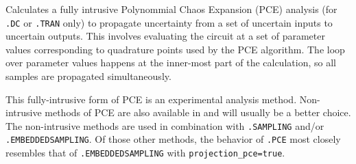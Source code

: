 

\label{PCE_section}
Calculates a fully intrusive Polynommial Chaos Expansion (PCE) analysis 
(for \verb|.DC| or \verb|.TRAN| only) 
to propagate uncertainty from a set of uncertain inputs to uncertain outputs.
This involves evaluating the circuit at a set of parameter values corresponding to
quadrature points used by the PCE algorithm.
The loop over parameter values happens at the inner-most part of the calculation, 
so all samples are propagated simultaneously.

This fully-intrusive form of PCE is an experimental analysis method.  Non-intrusive 
methods of PCE are also available in \Xyce{} and will usually be a better choice.  
The non-intrusive methods are used in combination with \texttt{.SAMPLING} 
and/or \texttt{.EMBEDDEDSAMPLING}.  Of those other methods, the behavior of \texttt{.PCE} 
most closely resembles that of \texttt{.EMBEDDEDSAMPLING} with \texttt{projection\_pce=true}.


